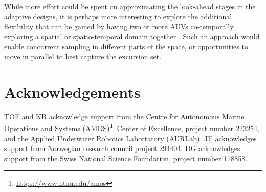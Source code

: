 \documentclass[aoas]{imsart}
\begin{document}
While more effort could be spent on approximating the look-ahead stages
in the adaptive designs, it is perhaps more interesting to explore the
additional flexibility that can be gained by having two or more AUVs
co-temporally exploring a spatial or spatio-temporal domain together
\citep{ferreira2019advancing}. Such an approach would enable
concurrent sampling in different parts of the space, or opportunities
to move in parallel to best capture the excursion set.

\section*{Acknowledgements}

TOF and KR acknowledge support from the Centre for Autonomous Marine
Operations and Systems
(AMOS)\footnote{\url{https://www.ntnu.edu/amos}}, Center of
Excellence, project number 223254, and the Applied Underwater Robotics
Labortatory (AURLab). JE acknowledges support from Norwegian research
council project 294404. DG acknowledges support from the Swiss
National Science Foundation, project number 178858.


\footnotesize



\end{document}
